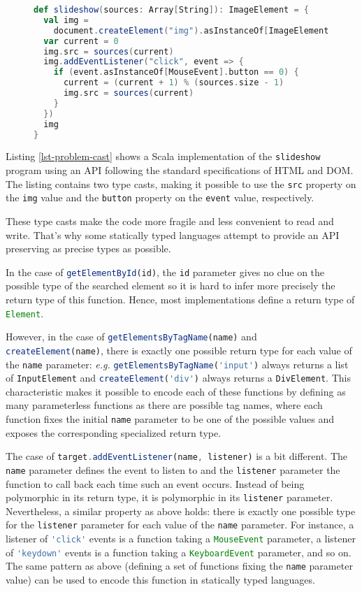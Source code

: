 \documentclass{llncs}
\newcommand{\jscode}[1]{\lstinline[language=JavaScript]|#1|}
\newcommand{\scalacode}[1]{\lstinline[language=Scala]|#1|}
\begin{document}
\begin{figure}
\begin{lstlisting}[label=lst-problem-cast,language=Scala,caption={Scala implementation of \texttt{slideshow} using the standard HTML and DOM API}]
def slideshow(sources: Array[String]): ImageElement = {
  val img =
    document.createElement("img").asInstanceOf[ImageElement]
  var current = 0
  img.src = sources(current)
  img.addEventListener("click", event => {
    if (event.asInstanceOf[MouseEvent].button == 0) {
      current = (current + 1) % (sources.size - 1)
      img.src = sources(current)
    }
  })
  img
}
\end{lstlisting}
\end{figure}

Listing \ref{lst-problem-cast} shows a Scala implementation of the \jscode{slideshow} program using an API following the standard specifications of HTML and DOM. The listing contains two type casts, making it possible to use the \scalacode{src} property on the \scalacode{img} value and the \scalacode{button} property on the \scalacode{event} value, respectively.

These type casts make the code more fragile and less convenient to read and write. That's why some statically typed languages attempt to provide an API preserving as precise types as possible.

In the case of \jscode{getElementById(id)}, the \jscode{id} parameter gives no clue on the possible type of the searched element so it is hard to infer more precisely the return type of this function. Hence, most implementations define a return type of \jscode{Element}.

However, in the case of \jscode{getElementsByTagName(name)} and \jscode{createElement(name)}, there is exactly one possible return type for each value of the \jscode{name} parameter: \emph{e.g.} \jscode{getElementsByTagName('input')} always returns a list of \jscode{InputElement} and \jscode{createElement('div')} always returns a \jscode{DivElement}. This characteristic makes it possible to encode each of these functions by defining as many parameterless functions as there are possible tag names, where each function fixes the initial \jscode{name} parameter to be one of the possible values and exposes the corresponding specialized return type.

The case of \jscode{target.addEventListener(name, listener)} is a bit different. The \jscode{name} parameter defines the event to listen to and the \jscode{listener} parameter the function to call back each time such an event occurs. Instead of being polymorphic in its return type, it is polymorphic in its \jscode{listener} parameter. Nevertheless, a similar property as above holds: there is exactly one possible type for the \jscode{listener} parameter for each value of the \jscode{name} parameter. For instance, a listener of \jscode{'click'} events is a function taking a \jscode{MouseEvent} parameter, a listener of \jscode{'keydown'} events is a function taking a \jscode{KeyboardEvent} parameter, and so on. The same pattern as above (defining a set of functions fixing the \jscode{name} parameter value) can be used to encode this function in statically typed languages.
\end{document}
